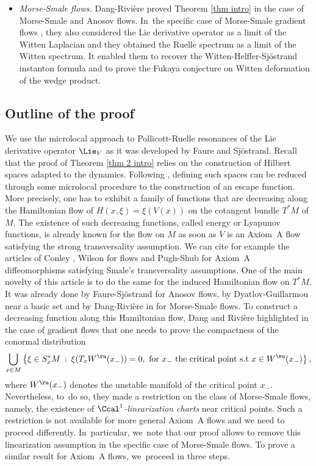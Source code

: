 \begin{itemize}
\item \emph{Morse-Smale flows.} Dang-Rivière \cite{DRIII} proved Theorem \ref{thm intro} in the case of Morse-Smale and Anosov flows. In~the specific case of Morse-Smale gradient flows \cite{DR_witten}, they also considered the Lie derivative operator as a limit of the Witten Laplacian and they obtained the Ruelle spectrum as a limit of the Witten spectrum. It enabled them to recover the Witten-Helffer-Sjöstrand instanton formula and to prove the Fukaya conjecture on Witten deformation of the wedge product.
\end{itemize}

\subsection{Outline of the proof} We use the microlocal approach to Pollicott-Ruelle resonances of the Lie derivative operator $\Lie_V$ as it was developed by Faure and Sjöstrand. Recall that the proof of Theorem \ref{thm 2 intro} relies on the construction of Hilbert spaces adapted to the dynamics. Following \cite{FS}, defining such spaces can be reduced through some microlocal procedure to the construction of an escape function. More precisely, one has to exhibit a family of functions that are decreasing along the Hamiltonian flow of $H(x,\xi)= \xi(V(x))$ on the cotangent bundle $T^*M$ of $M$. The existence of such decreasing functions, called energy or Lyapunov functions, is already known for the flow on $M$ as soon as $V$ is an Axiom~A flow satisfying the strong transversality assumption. We can cite for example the articles of Conley \cite{conley}, Wilson \cite{wilson} for flows and Pugh-Shub \cite{pugh-shub} for Axiom~A diffeomorphisms satisfying Smale's transversality assumptions. One of the main novelty of this article is to do the same for the induced Hamiltonian flow on $T^*M$. It was already done by Faure-Sjöstrand \cite{FS} for Anosov flows, by Dyatlov-Guillarmou \cite{dyatlov-guillarmou_2016} near a basic set and by Dang-Rivière in \cite{DR0,DRI} for Morse-Smale flows. To construct a decreasing function along this Hamiltonian flow, Dang and Rivière highlighted in the case of gradient flows \cite{DR0} that one needs to prove the compactness of the conormal distribution\enlargethispage{.5\baselineskip}
\[
\bigcup_{x \in M} \left\{ \xi \in S_x^* M \:: \: \xi (T_x W^\ru (x_{-})) = 0, \text{ for } x_- \text{ the critical point s.t } x \in W^\ru (x_{-}) \right\},
\]
where $W^\ru (x_-)$ denotes the unstable manifold of the critical point $x_-$. Nevertheless, to~do so, they made a restriction on the class of Morse-Smale flows, namely, the existence of $\Ccal^1$\textit{-linearization charts} near critical points. Such a restriction is not available for more general Axiom~A flows and we need to proceed differently. In~particular, we~note that our proof allows to remove this linearization assumption in the specific case of Morse-Smale flows. To prove a similar result for Axiom~A flows, we~proceed in three steps.
